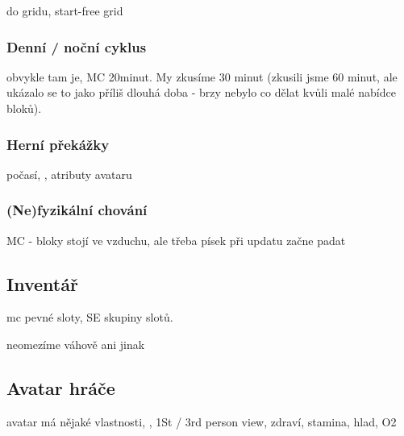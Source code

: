 do gridu, start-free grid


\subsubsection{Denní / noční cyklus}

obvykle tam je, MC 20minut. My zkusíme 30 minut (zkusili jsme 60 minut, ale ukázalo se to jako příliš dlouhá doba - brzy nebylo co dělat kvůli malé nabídce bloků).

\subsubsection{Herní překážky}

počasí, \NPC{}, atributy avataru

\subsubsection{(Ne)fyzikální chování}

MC - bloky stojí ve vzduchu, ale třeba písek při updatu začne padat

\subsection{Inventář}

mc pevné sloty, SE skupiny slotů.

neomezíme váhově ani jinak 

\subsection{Avatar hráče}
avatar má nějaké vlastnosti, \HUD{}, 1St / 3rd person view, zdraví, stamina, hlad, O2



